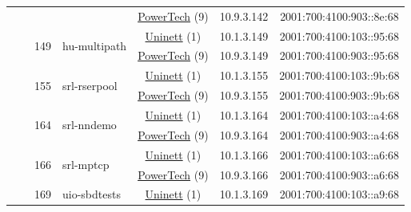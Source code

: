 \begin{small}
\begin{center}
\begin{longtable}{|c|c|c|c|c|c|c|c|}
  &  &  &  & \multicolumn{2}{|c|}{\tiny{\href{http://www.powertech.no}{PowerTech} (9)}} & \tiny{10.9.3.142} & \tiny{2001:700:4100:903::8e:68} \\* \cline{3-3}\cline{4-4}\cline{5-5}\cline{6-6}\cline{7-7}\cline{8-8}
  &  & \multirow{2}{*}{\tiny{149}} & \multicolumn{1}{|l|}{\multirow{2}{*}{\tiny{hu-multipath}}} & \multicolumn{2}{|c|}{\tiny{\href{https://www.uninett.no}{Uninett} (1)}} & \tiny{10.1.3.149} & \tiny{2001:700:4100:103::95:68} \\* \cline{5-5}\cline{6-6}\cline{7-7}\cline{8-8}
  &  &  &  & \multicolumn{2}{|c|}{\tiny{\href{http://www.powertech.no}{PowerTech} (9)}} & \tiny{10.9.3.149} & \tiny{2001:700:4100:903::95:68} \\* \cline{3-3}\cline{4-4}\cline{5-5}\cline{6-6}\cline{7-7}\cline{8-8}
  &  & \multirow{2}{*}{\tiny{155}} & \multicolumn{1}{|l|}{\multirow{2}{*}{\tiny{srl-rserpool}}} & \multicolumn{2}{|c|}{\tiny{\href{https://www.uninett.no}{Uninett} (1)}} & \tiny{10.1.3.155} & \tiny{2001:700:4100:103::9b:68} \\* \cline{5-5}\cline{6-6}\cline{7-7}\cline{8-8}
  &  &  &  & \multicolumn{2}{|c|}{\tiny{\href{http://www.powertech.no}{PowerTech} (9)}} & \tiny{10.9.3.155} & \tiny{2001:700:4100:903::9b:68} \\* \cline{3-3}\cline{4-4}\cline{5-5}\cline{6-6}\cline{7-7}\cline{8-8}
  &  & \multirow{2}{*}{\tiny{164}} & \multicolumn{1}{|l|}{\multirow{2}{*}{\tiny{srl-nndemo}}} & \multicolumn{2}{|c|}{\tiny{\href{https://www.uninett.no}{Uninett} (1)}} & \tiny{10.1.3.164} & \tiny{2001:700:4100:103::a4:68} \\* \cline{5-5}\cline{6-6}\cline{7-7}\cline{8-8}
  &  &  &  & \multicolumn{2}{|c|}{\tiny{\href{http://www.powertech.no}{PowerTech} (9)}} & \tiny{10.9.3.164} & \tiny{2001:700:4100:903::a4:68} \\* \cline{3-3}\cline{4-4}\cline{5-5}\cline{6-6}\cline{7-7}\cline{8-8}
  &  & \multirow{2}{*}{\tiny{166}} & \multicolumn{1}{|l|}{\multirow{2}{*}{\tiny{srl-mptcp}}} & \multicolumn{2}{|c|}{\tiny{\href{https://www.uninett.no}{Uninett} (1)}} & \tiny{10.1.3.166} & \tiny{2001:700:4100:103::a6:68} \\* \cline{5-5}\cline{6-6}\cline{7-7}\cline{8-8}
  &  &  &  & \multicolumn{2}{|c|}{\tiny{\href{http://www.powertech.no}{PowerTech} (9)}} & \tiny{10.9.3.166} & \tiny{2001:700:4100:903::a6:68} \\* \cline{3-3}\cline{4-4}\cline{5-5}\cline{6-6}\cline{7-7}\cline{8-8}
  &  & \multirow{2}{*}{\tiny{169}} & \multicolumn{1}{|l|}{\multirow{2}{*}{\tiny{uio-sbdtests}}} & \multicolumn{2}{|c|}{\tiny{\href{https://www.uninett.no}{Uninett} (1)}} & \tiny{10.1.3.169} & \tiny{2001:700:4100:103::a9:68} \\* \cline{5-5}\cline{6-6}\cline{7-7}\cline{8-8}

\end{longtable}
\end{center}
\end{small}
